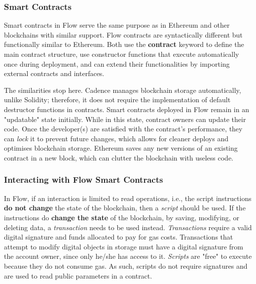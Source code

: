 \documentclass[../NFTComp_IEEE.tex]{subfiles}
\begin{document}
\subsubsection{Smart Contracts}
\label{sec:smart_contracts}
Smart contracts in Flow serve the same purpose as in Ethereum and other blockchains with similar support. Flow contracts are syntactically different but functionally similar to Ethereum. Both use the \textbf{contract} keyword to define the main contract structure, use constructor functions that execute automatically once during deployment, and can extend their functionalities by importing external contracts and interfaces.
\par
The similarities stop here. Cadence manages blockchain storage automatically, unlike Solidity; therefore, it does not require the implementation of default destructor functions in contracts. Smart contracts deployed in Flow remain in an "updatable" state initially. While in this state, contract owners can update their code. Once the developer(s) are satisfied with the contract's performance, they can \textit{lock} it to prevent future changes, which allows for cleaner deploys and optimises blockchain storage. Ethereum saves any new versions of an existing contract in a new block, which can clutter the blockchain with useless code.

\subsubsection{Interacting with Flow Smart Contracts}
In Flow, if an interaction is limited to read operations, i.e., the script instructions \textbf{do not change} the state of the blockchain, then a \textit{script} should be used. If the instructions do \textbf{change the state} of the blockchain, by saving, modifying, or deleting data, a \textit{transaction} needs to be used instead. \textit{Transactions} require a valid digital signature and funds allocated to pay for gas costs. Transactions that attempt to modify digital objects in storage must have a digital signature from the account owner, since only he/she has access to it. \textit{Scripts} are "free" to execute because they do not consume gas. As such, scripts do not require signatures and are used to read public parameters in a contract.
\end{document}
